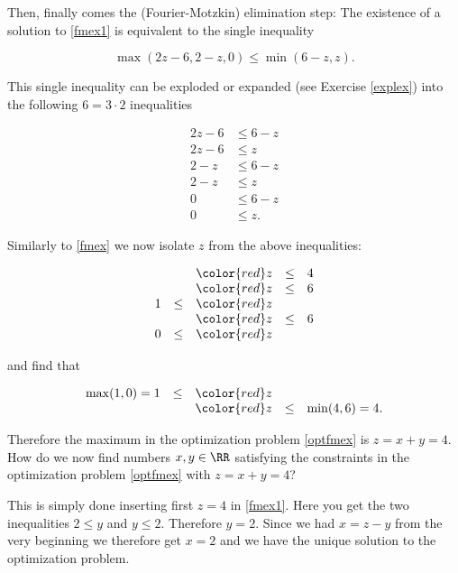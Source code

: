 \documentclass{article}
\begin{document}
Then, finally comes the (Fourier-Motzkin) elimination step: The existence of a solution to \eqref{fmex1} is
equivalent to the single inequality

\begin{equation}\label{singleineq}
\max(2 z - 6, 2 - z, 0) \leq \min(6 - z, z).
\end{equation}

This single inequality can be exploded or expanded (see Exercise \ref{explex}) into the following $6 = 3\cdot 2$ inequalities

\begin{align*}
2 z - 6 &\leq 6 - z\\
2 z - 6 &\leq z\\
2 - z &\leq 6 - z\\
2 - z &\leq z\\
0 &\leq 6 - z\\
0 &\leq z.
\end{align*}

Similarly to \eqref{fmex} we now isolate $z$ from the above inequalities:

\begin{equation*}
  \begin{array}{lllll}
&&{\color{red} z} &\leq &4\\
&&{\color{red} z} &\leq &6\\
1&\leq &{\color{red} z}\\
&&{\color{red} z} &\leq &6\\
0&\leq &{\color{red} z}
\end{array}
\end{equation*}

and find that

\begin{equation*}
  \begin{array}{lllll}
\max(1, 0) = 1 &\leq &{\color{red} z}\\
&& {\color{red} z} & \leq &\min(4, 6) = 4.
  \end{array}
\end{equation*}


Therefore the maximum in the optimization problem \eqref{optfmex} is $z = x + y = 4$. 
How do we now find numbers $x, y\in \RR$ satisfying the constraints
in the optimization problem \eqref{optfmex} with $z = x + y = 4$?

This is simply done inserting first $z = 4$ in \eqref{fmex1}. Here you get the two inequalities
$2 \leq y$ and $y\leq 2$. Therefore $y = 2$. Since we had $x = z - y$ from the very beginning
we therefore get $x = 2$ and we have the unique solution to the optimization problem.
\end{document}
